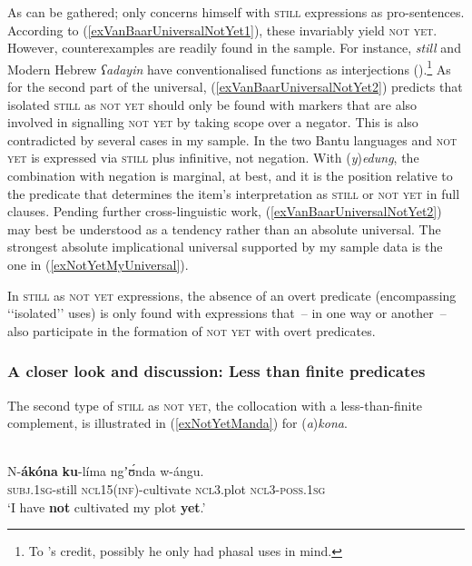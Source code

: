 As can be gathered; \citeauthor{vanBaar1997} only concerns himself with \textsc{still} expressions as pro-sentences. According to (\ref{exVanBaarUniversalNotYet1}), these invariably yield \textsc{not yet}. However, counterexamples are readily found in the sample. For instance,  \textit{still} and Modern Hebrew \textit{ʕadayin} have conventionalised functions as  interjections ().\footnote{To \citeauthor{vanBaar1997}'s credit, possibly he only had phasal uses in mind.}  As for the second part of the universal, (\ref{exVanBaarUniversalNotYet2}) predicts that isolated \textsc{still} as \textsc{not yet} should only be found with markers that are also involved in signalling \textsc{not yet} by taking scope over a negator. This is also contradicted by several cases in my sample. In the two Bantu languages  and  \textsc{not yet} is expressed via \textsc{still} plus infinitive, not negation. With  \mbox{(\textit{y})\textit{edung}}, the combination with negation is marginal, at best, and it is the position relative to the predicate that determines the item's interpretation as \textsc{still} or \textsc{not yet} in full clauses. Pending further cross-linguistic work, (\ref{exVanBaarUniversalNotYet2}) may best be understood as a tendency rather than an absolute universal. The strongest absolute implicational universal supported by my sample data is the one in (\ref{exNotYetMyUniversal}). 

\begin{exe}
	\ex In \textsc{still} as \textsc{not yet} expressions, the absence of an overt predicate (encompassing \lq\lq isolated\rq\rq{ }uses) is only found with expressions  that~– in one way or another~-- also participate in the formation of \textsc{not yet} with overt predicates.\label{exNotYetMyUniversal}
\end{exe}

\subsubsection{A closer look and discussion: Less than finite predicates}
The second type of \textsc{still} as \textsc{not yet}, the collocation with a less-than-finite complement, is illustrated in (\ref{exNotYetManda}) for  \mbox{(\textit{a})\textit{kona}}.

\begin{exe}
	\ex{}\label{exNotYetManda}\\
	\gll N-\textbf{ákóna} \textbf{ku}-líma ngʼʊ́nda w-ángu.\\
	\textsc{subj}.1\textsc{sg}-still \textsc{ncl}15(\textsc{inf})-cultivate \textsc{ncl}3.plot \textsc{ncl}3-\textsc{poss}.1\textsc{sg}\\
	\glt \lq I have \textbf{not} cultivated my plot \textbf{yet}.' \parencite[45]{Bernander2021}
\end{exe}

